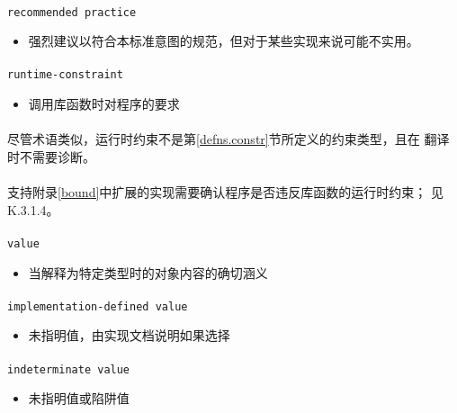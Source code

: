 \paragraph{}
\texttt{recommended practice}
\begin{itemize}
  \item[]{强烈建议以符合本标准意图的规范，但对于某些实现来说可能不实用。}
\end{itemize}

\paragraph{}
\texttt{runtime-constraint}
\begin{itemize}
  \item[]{调用库函数时对程序的要求}
\end{itemize}

\paragraph{}
\notes 尽管术语类似，运行时约束不是第\ref{defns.constr}节所定义的约束类型，且在
翻译时不需要诊断。

\paragraph{}
\notes 支持附录\ref{bound}中扩展的实现需要确认程序是否违反库函数的运行时约束；
见K.3.1.4。

\paragraph{}
\texttt{value}
\begin{itemize}
  \item[]{当解释为特定类型时的对象内容的确切涵义}
\end{itemize}

\paragraph{}
\texttt{implementation-defined value}
\begin{itemize}
  \item[]{未指明值，由实现文档说明如果选择}
\end{itemize}

\paragraph{}
\texttt{indeterminate value}
\begin{itemize}
  \item[]{未指明值或陷阱值}
\end{itemize}

